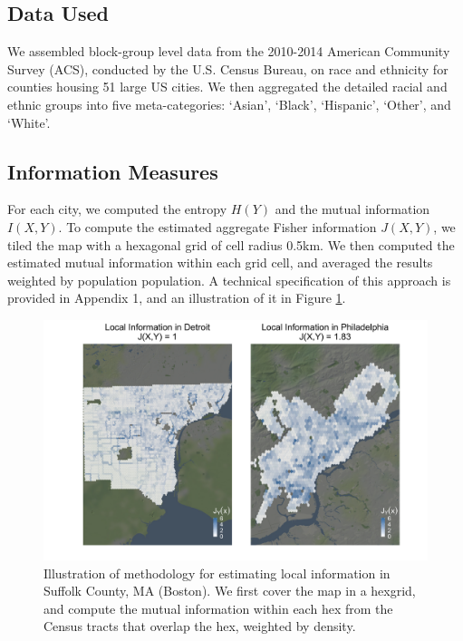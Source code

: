 \nocite{Bivand2014b,Bivand2014a,Bivand2014} %

\subsection{Data Used}
	We assembled block-group level data from the 2010-2014 American Community Survey (ACS), conducted by the U.S. Census Bureau, on race and ethnicity for counties housing 51 large US cities. We then aggregated the detailed racial and ethnic groups into five meta-categories: `Asian', `Black', `Hispanic', `Other', and `White'.

\subsection{Information Measures}

	 For each city, we computed the entropy $H(Y)$ and the mutual information $I(X,Y)$. To compute the estimated aggregate Fisher information $J(X,Y)$, we tiled the map with a hexagonal grid of cell radius 0.5km. We then computed the estimated mutual information within each grid cell, and averaged the results weighted by population population. A technical specification of this approach is provided in Appendix 1, and an illustration of it in Figure \ref{fig:method}. 

	 \begin{figure}
		\centering
		\includegraphics[width=.8\textwidth]{figs/method_illustration.png}
		\caption{Illustration of methodology for estimating local information in Suffolk County, MA (Boston). We first cover the map in a hexgrid, and compute the mutual information within each hex from the Census tracts that overlap the hex, weighted by density. }
		\label{fig:method}
	\end{figure}


